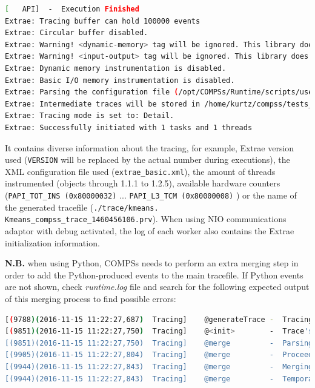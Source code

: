 \begin{lstlisting}[language=bash]
[   API]  -  Execution Finished
Extrae: Tracing buffer can hold 100000 events
Extrae: Circular buffer disabled.
Extrae: Warning! <dynamic-memory> tag will be ignored. This library does support instrumenting dynamic memory calls.
Extrae: Warning! <input-output> tag will be ignored. This library does support instrumenting I/O calls.
Extrae: Dynamic memory instrumentation is disabled.
Extrae: Basic I/O memory instrumentation is disabled.
Extrae: Parsing the configuration file (/opt/COMPSs/Runtime/scripts/user/../../configuration/xml/tracing/extrae_basic.xml) has ended
Extrae: Intermediate traces will be stored in /home/kurtz/compss/tests_local/app10
Extrae: Tracing mode is set to: Detail.
Extrae: Successfully initiated with 1 tasks and 1 threads
\end{lstlisting}

It contains diverse information about the tracing, for example, Extrae version used (\verb|VERSION| will be replaced by the actual 
number during executions), the XML configuration file used (\verb|extrae_basic.xml|), the amount of threads instrumented 
(objects through 1.1.1 to 1.2.5), available hardware counters (\verb|PAPI_TOT_INS (0x80000032)| ... \verb|PAPI_L3_TCM (0x80000008)| )
or the name of the generated tracefile (\verb|./trace/kmeans.| \verb|Kmeans_compss_trace_1460456106.prv|). When using NIO communications 
adaptor with debug activated, the log of each worker also contains the Extrae initialization information.

\textbf{N.B.} when using Python, COMPSs needs to perform an extra merging step in order to add the Python-produced events to the main 
tracefile. If Python events are not shown, check \textit{runtime.log} file and search for the following expected output of this 
merging process to find possible errors:

\begin{lstlisting}[language=bash]
[(9788)(2016-11-15 11:22:27,687)  Tracing]    @generateTrace -  Tracing: Generating trace
[(9851)(2016-11-15 11:22:27,750)  Tracing]    @<init>        -  Trace's merger initialization successful
[(9851)(2016-11-15 11:22:27,750)  Tracing]    @merge         -  Parsing master sync events
[(9905)(2016-11-15 11:22:27,804)  Tracing]    @merge         -  Proceeding to merge task traces into master
[(9944)(2016-11-15 11:22:27,843)  Tracing]    @merge         -  Merging finished,
[(9944)(2016-11-15 11:22:27,843)  Tracing]    @merge         -  Temporal task folder removed.
\end{lstlisting}


